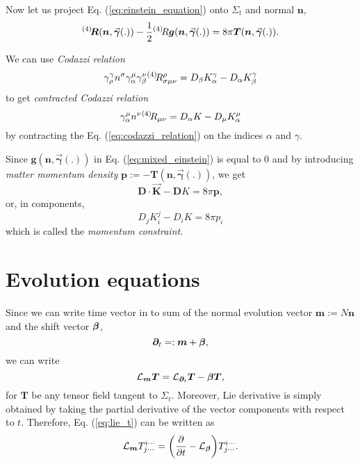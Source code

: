 Now let us project Eq. (\ref{eq:einstein_equation}) onto $\Sigma_t$ and normal $\bm{n}$,
\begin{equation}
	\label{eq:mixed_einstein}
	{}^{(4)}\hspace{-0.2em} \bm{R}(\bm{n}, \vec{\bm{\gamma}}(.)) - \frac{1}{2} {}^{(4)}\hspace{-0.2em} R \bm{g}(\bm{n}, \vec{\bm{\gamma}}(.)) = 8\pi \bm{T}(\bm{n}, \vec{\bm{\gamma}}(.)).
\end{equation}

We can use \emph{Codazzi relation}
\begin{equation}
	\label{eq:codazzi_relation}
	\gamma^\gamma_\rho n^\sigma \gamma^\mu_\alpha\gamma^\nu_\beta {}^{(4)}\hspace{-0.2em} R^\rho_{\sigma \mu \nu} = D_\beta K^\gamma_\alpha - D_\alpha K^\gamma_\beta
\end{equation}
to get \emph{contracted Codazzi relation}
\begin{equation}
	\gamma^\mu_\alpha n^\nu {}^{(4)}\hspace{-0.2em} R_{\mu \nu} = D_\alpha K - D_\mu K^\mu _\alpha
\end{equation}
by contracting the Eq. (\ref{eq:codazzi_relation}) on the indices $\alpha$ and $\gamma$.

Since $\bm{g}(\bm{n}, \vec{\bm{\gamma}}(.))$ in Eq. (\ref{eq:mixed_einstein}) is equal to $0$ and by introducing \emph{matter momentum density} $\bm{p}:= - \bm{T}(\bm{n}, \vec{\bm{\gamma}}(.))$, we get
\begin{equation}
	\bm{D}\cdot \vec{\bm{K}} - \bm{D}K = 8 \pi \bm{p},
\end{equation}
or, in components,
\begin{equation}
	D_j K^j_i - D_i K = 8 \pi p_i
\end{equation}
which is called the \emph{momentum constraint}.



\section{Evolution equations}

Since we can write time vector in to sum of the normal evolution vector $\bm{m} := N\bm{n}$ and the shift vector $\bm{\beta}$,
\begin{equation}
	\label{eq:timevec}
	\bm{\partial}_t =: \bm{m} + \bm{\beta},
\end{equation}
we can write
\begin{equation}
	\label{eq:lie_t}
	\mathcal{L}_{\bm{m}}\bm{T} = \mathcal{L}_{\bm{\partial}_t}\bm{T} - \mathcal{\bm{\beta}}\bm{T},
\end{equation}
for $\bm{T}$ be any tensor field tangent to $\Sigma_t$. Moreover, Lie derivative is simply obtained by taking the partial derivative of the vector components with respect to $t$. Therefore, Eq. (\ref{eq:lie_t}) can be written as
\begin{equation}
	\mathcal{L}_{\bm{m}} T^{i\cdots}_{j\cdots} = \qty(\pdv{t} - \mathcal{L}_{\bm{\beta}}) T^{i\cdots}_{j\cdots}.
\end{equation}

